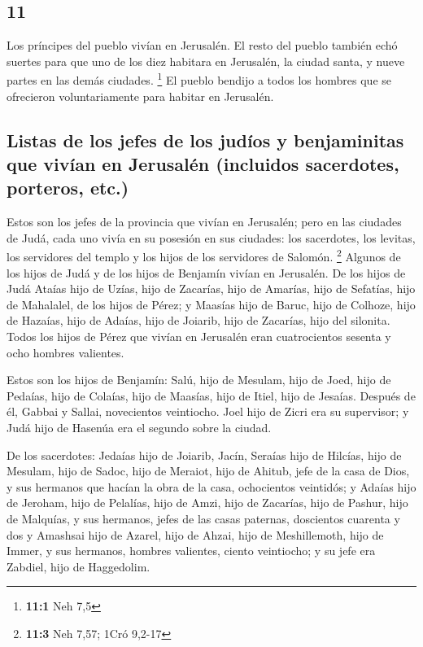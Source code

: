 \begin{paracol}{2}
\hypertarget{section-20}{%
\section{11}\label{section-20}}

 Los príncipes del pueblo vivían en Jerusalén. El resto
del pueblo también echó suertes para que uno de los diez habitara en
Jerusalén, la ciudad santa, y nueve partes en las demás ciudades.
\footnote{\textbf{11:1} Neh 7,5}  El pueblo bendijo a
todos los hombres que se ofrecieron voluntariamente para habitar en
Jerusalén.

\hypertarget{listas-de-los-jefes-de-los-juduxedos-y-benjaminitas-que-vivuxedan-en-jerusaluxe9n-incluidos-sacerdotes-porteros-etc.}{%
\subsection{Listas de los jefes de los judíos y benjaminitas que vivían
en Jerusalén (incluidos sacerdotes, porteros,
etc.)}\label{listas-de-los-jefes-de-los-juduxedos-y-benjaminitas-que-vivuxedan-en-jerusaluxe9n-incluidos-sacerdotes-porteros-etc.}}

 Estos son los jefes de la provincia que vivían en
Jerusalén; pero en las ciudades de Judá, cada uno vivía en su posesión
en sus ciudades: los sacerdotes, los levitas, los servidores del templo
y los hijos de los servidores de Salomón. \footnote{\textbf{11:3} Neh
  7,57; 1Cró 9,2-17}  Algunos de los hijos de Judá y de
los hijos de Benjamín vivían en Jerusalén. De los hijos de Judá Ataías
hijo de Uzías, hijo de Zacarías, hijo de Amarías, hijo de Sefatías, hijo
de Mahalalel, de los hijos de Pérez;  y Maasías hijo de
Baruc, hijo de Colhoze, hijo de Hazaías, hijo de Adaías, hijo de
Joiarib, hijo de Zacarías, hijo del silonita.  Todos los
hijos de Pérez que vivían en Jerusalén eran cuatrocientos sesenta y ocho
hombres valientes.

 Estos son los hijos de Benjamín: Salú, hijo de Mesulam,
hijo de Joed, hijo de Pedaías, hijo de Colaías, hijo de Maasías, hijo de
Itiel, hijo de Jesaías.  Después de él, Gabbai y Sallai,
novecientos veintiocho.  Joel hijo de Zicri era su
supervisor; y Judá hijo de Hasenúa era el segundo sobre la ciudad.

 De los sacerdotes: Jedaías hijo de Joiarib, Jacín,
 Seraías hijo de Hilcías, hijo de Mesulam, hijo de Sadoc,
hijo de Meraiot, hijo de Ahitub, jefe de la casa de Dios,
 y sus hermanos que hacían la obra de la casa,
ochocientos veintidós; y Adaías hijo de Jeroham, hijo de Pelalías, hijo
de Amzi, hijo de Zacarías, hijo de Pashur, hijo de Malquías,
 y sus hermanos, jefes de las casas paternas, doscientos
cuarenta y dos y Amashsai hijo de Azarel, hijo de Ahzai, hijo de
Meshillemoth, hijo de Immer,  y sus hermanos, hombres
valientes, ciento veintiocho; y su jefe era Zabdiel, hijo de Haggedolim.


\end{paracol}

